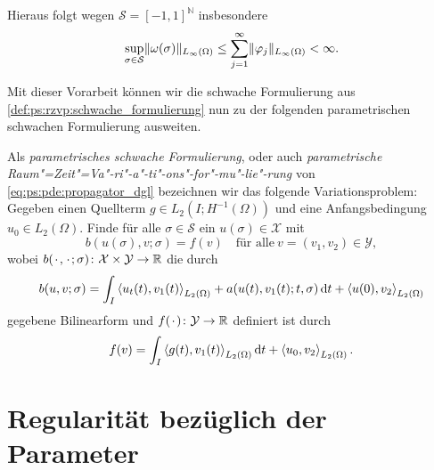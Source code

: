 Hieraus folgt wegen $\mathcal S = [-1, 1]^{\mathbb{N}}$ insbesondere
\begin{equation}
\label{eq:ps:pf:omega_norm_abschaetzung}
    \sup_{\sigma \in \mathcal S} \lVert\omega(\sigma)\rVert_{L_{\infty}(\Omega)} \leq \sum_{j = 1}^{\infty} \lVert\varphi_{j}\rVert_{L_{\infty}(\Omega)} < \infty.
\end{equation}

Mit dieser Vorarbeit können wir die schwache Formulierung aus \cref{def:ps:rzvp:schwache_formulierung} nun zu der folgenden parametrischen schwachen Formulierung ausweiten.


\begin{Definition}
\label{def:ps:pf:schwache_formulierung}
    Als \emph{parametrisches schwache Formulierung}, oder auch \emph{parametrische Raum"=Zeit"=Va"-ri"-a"-ti"-ons"-for"-mu"-lie"-rung} von \cref{eq:ps:pde:propagator_dgl} bezeichnen wir das folgende Variationsproblem:
    Gegeben einen Quellterm $g \in L_{2}(I; H^{-1}(\Omega))$ und eine Anfangsbedingung $u_{0} \in L_{2}(\Omega)$.
    Finde für alle $\sigma \in \mathcal S$ ein $u(\sigma) \in \mathcal X$ mit
    \begin{equation}
        \label{eq:ps:pf:schwache_formulierung}
        b(u(\sigma), v; \sigma) = f(v) \quad \text{für alle}~v = (v_{1}, v_{2}) \in \mathcal Y,
    \end{equation}
    wobei $b({\mkern2mu\cdot\mkern2mu}, {\mkern2mu\cdot\mkern2mu}; \sigma) \colon \mathcal X \times \mathcal Y \to \mathbb{R}$ die durch
    \begin{equation}
        \label{eq:ps:pf:schwache_formulierung_lhs_b}
        b(u, v; \sigma)
            = \int_{I} \left\langle u_{t}(t),v_{1}(t)\right\rangle_{L_{2}(\Omega)} + a(u(t), v_{1}(t); t, \sigma) \mathop{}\!\mathrm{d} t + \left\langle u(0),v_{2}\right\rangle_{L_{2}(\Omega)}
    \end{equation}
    gegebene Bilinearform und $f({\mkern2mu\cdot\mkern2mu}) \colon \mathcal Y \to \mathbb{R}$ definiert ist durch
    \begin{equation}
        \label{eq:ps:pf:schwache_formulierung_rhs_f}
        f(v) = \int_{I} \left\langle g(t),v_{1}(t)\right\rangle_{L_{2}(\Omega)} \mathop{}\!\mathrm{d} t + \left\langle u_{0},v_{2}\right\rangle_{L_{2}(\Omega)}.
    \end{equation}
\end{Definition}



\section{Regularität bezüglich der Parameter} %
\label{sec:ps:rg:regularitaet_bezueglich_der_parameter}

